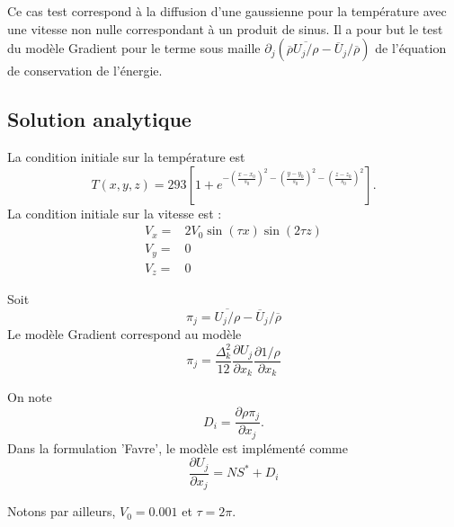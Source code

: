Ce cas test correspond \`a la diffusion d'une gaussienne pour la temp\'erature avec une vitesse non nulle correspondant \`a un produit de sinus. Il a pour but le test du mod\`ele Gradient pour le terme sous maille $\partial_j\left(\overline{\rho} \overline{U_j/\rho} - \overline{U}_j/\overline{\rho}\right)$ de l'\'equation de conservation de l'\'energie.

\subsection{Solution analytique}

La condition initiale sur la temp\'erature est
\begin{equation}
T\left(x,y,z\right) = 293 \left[1 + e^{-\left(\frac{x-x_0}{s_0}\right)^2-\left(\frac{y-y_0}{s_0}\right)^2-\left(\frac{z-z_0}{s_0}\right)^2}\right].
\end{equation}
La condition initiale sur la vitesse est :
\begin{align*}
V_x ={}& 2 V_0 \sin(\tau x) \sin(2 \tau z) \\
V_y ={}& 0 \\
V_z ={}& 0
\end{align*}

Soit
\begin{equation}
\pi_{j} = \overline{U_j/\rho} - \overline{U}_j/\overline{\rho}
\end{equation}
Le mod\`ele Gradient correspond au mod\`ele
\begin{equation}
\pi_{j} = \frac{\Delta_k^2}{12} \frac{\partial U_j}{\partial x_k} \frac{\partial 1/\rho}{\partial x_k}
\end{equation}

On note
\begin{equation}
D_i = \frac{\partial \rho \pi_{j}}{\partial x_j}.
\end{equation}
Dans la formulation 'Favre', le mod\`ele est impl\'ement\'e comme
\begin{equation}
\frac{\partial U_{j}}{\partial x_j} = NS^* + D_i
\end{equation}

Notons par ailleurs, $V_0 = 0.001$ et $\tau=2\pi$.

